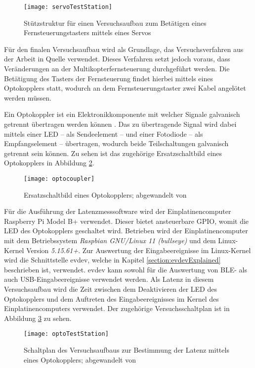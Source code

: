 \begin{figure}[H]
    \centering
    \texttt{[image: servoTestStation]}
    \caption{Stützstruktur für einen Versuchsaufbau zum Betätigen eines Fernsteuerungstasters mittels eines Servos}
    \label{fig:servoTestStation}
\end{figure}

Für den finalen Versuchsaufbau wird als Grundlage, das Versuchsverfahren aus der Arbeit in Quelle \cite{wimmerLatenzStation} verwendet. Dieses Verfahren setzt jedoch voraus, dass Veränderungen an der Multikopterfernsteuerung durchgeführt werden. Die Betätigung des Tasters der Fernsteuerung findet hierbei mittels eines Optokopplers statt, wodurch an dem Fernsteuerungstaster zwei Kabel angelötet werden müssen.

Ein Optokoppler ist ein Elektronikkomponente mit welcher Signale galvanisch getrennt übertragen werden können \cite{elektronikKompendiumOptokoppler}. Das zu übertragende Signal wird dabei mittels einer \ac{LED} -- als Sendeelement -- und einer Fotodiode -- als Empfangselement -- übertragen, wodurch beide Teilschaltungen galvanisch getrennt sein können. Zu sehen ist das zugehörige Ersatzschaltbild eines Optokopplers in Abbildung \ref{fig:optocoupler}.

\begin{figure}[H]
    \centering
    \texttt{[image: optocoupler]}
    \caption{Ersatzschaltbild eines Optokopplers; abgewandelt von \cite{altiumOptokoppler}}
    \label{fig:optocoupler}
\end{figure}

Für die Ausführung der Latenzmesssoftware wird der Einplatinencomputer Raspberry Pi Model B+ verwendet. Dieser bietet ansteuerbare \acs{GPIO}, womit die \ac{LED} des Optokopplers geschaltet wird. Betrieben wird der Einplatinencomputer mit dem Betriebssystem \textit{Raspbian GNU/Linux 11 (bullseye)} und dem Linux-Kernel Version \textit{5.15.61+}. Zur Auswertung der Eingabeereignisse im Linux-Kernel wird die Schnittstelle evdev, welche in Kapitel \ref{section:evdevExplained} beschrieben ist, verwendet. evdev kann sowohl für die Auswertung von \ac{BLE}- als auch USB-Eingabeereignisse verwendet werden. Als Latenz in diesem Versuchsaufbau wird die Zeit zwischen dem Deaktivieren der \ac{LED} des Optokopplers und dem Auftreten des Eingabeereignisses im Kernel des Einplatinencomputers verwendet. Der zugehörige Versuchsschaltplan ist in Abbildung \ref{fig:optoTestStation} zu sehen.

\begin{figure}[H]
    \centering
    \texttt{[image: optoTestStation]}
    \caption{Schaltplan des Versuchsaufbaus zur Bestimmung der Latenz mittels eines Optokopplers; abgewandelt von \cites{wimmerLatenzStation}[S.~8; S.~12]{LTV817}}
    \label{fig:optoTestStation}
\end{figure}

